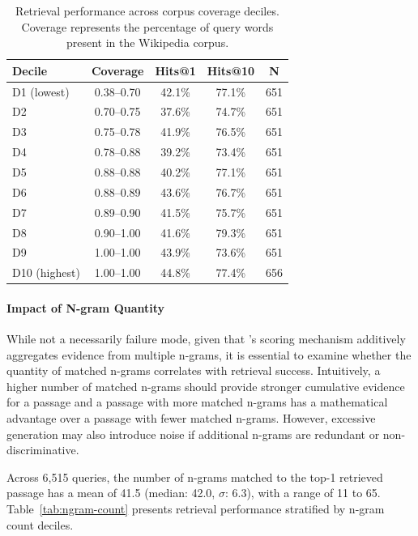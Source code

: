 \begin{table}[H]
\centering
\caption{Retrieval performance across corpus coverage deciles. Coverage represents the percentage of query words present in the Wikipedia corpus.}
\label{tab:coverage}
\begin{tabular}{lcccc}
\hline
\textbf{Decile} & \textbf{Coverage} & \textbf{Hits@1} & \textbf{Hits@10} & \textbf{N} \\
\hline
D1 (lowest)  & 0.38--0.70 & 42.1\% & 77.1\% & 651 \\
D2           & 0.70--0.75 & 37.6\% & 74.7\% & 651 \\
D3           & 0.75--0.78 & 41.9\% & 76.5\% & 651 \\
D4           & 0.78--0.88 & 39.2\% & 73.4\% & 651 \\
D5           & 0.88--0.88 & 40.2\% & 77.1\% & 651 \\
D6           & 0.88--0.89 & 43.6\% & 76.7\% & 651 \\
D7           & 0.89--0.90 & 41.5\% & 75.7\% & 651 \\
D8           & 0.90--1.00 & 41.6\% & 79.3\% & 651 \\
D9           & 1.00--1.00 & 43.9\% & 73.6\% & 651 \\
D10 (highest)& 1.00--1.00 & 44.8\% & 77.4\% & 656 \\
\hline
\end{tabular}
\end{table}


\paragraph{Impact of N-gram Quantity}

While not a necessarily failure mode, given that 's scoring mechanism additively aggregates evidence from multiple n-grams, it is essential to examine whether the quantity of matched n-grams correlates with retrieval success. Intuitively, a higher number of matched n-grams should provide stronger cumulative evidence for a passage and a passage with more matched n-grams has a mathematical advantage over a passage with fewer matched n-grams. However, excessive generation may also introduce noise if additional n-grams are redundant or non-discriminative.

Across 6,515 queries, the number of n-grams matched to the top-1 retrieved passage has a mean of 41.5 (median: 42.0, $\sigma$: 6.3), with a range of 11 to 65. Table~\ref{tab:ngram-count} presents retrieval performance stratified by n-gram count deciles.

